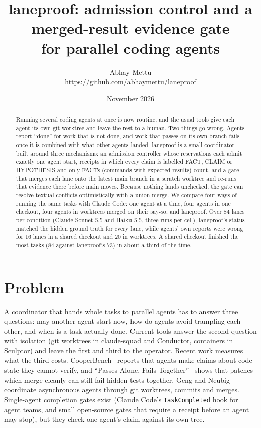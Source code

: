 \documentclass[11pt]{article}
\title{laneproof: admission control and a merged-result evidence gate\\for parallel coding agents}
\author{Abhay Mettu\\\small\url{https://github.com/abhaymettu/laneproof}}
\date{November 2026}
\begin{document}
\maketitle

\begin{abstract}
Running several coding agents at once is now routine, and the usual tools give each agent its own git worktree and
leave the rest to a human. Two things go wrong. Agents report ``done'' for work that is not done, and work that
passes on its own branch fails once it is combined with what other agents landed. laneproof is a small coordinator
built around three mechanisms: an admission controller whose reservations each admit exactly one agent start, receipts
in which every claim is labelled FACT, CLAIM or HYPOTHESIS and only FACTs (commands with expected results) count, and
a gate that merges each lane onto the latest main branch in a scratch worktree and re-runs that evidence there before
main moves. Because nothing lands unchecked, the gate can resolve textual conflicts optimistically with a union merge.
We compare four ways of running the same tasks with Claude Code: one agent at a time, four agents in one checkout,
four agents in worktrees merged on their say-so, and laneproof. Over 84 lanes per condition (Claude Sonnet 5.5 and Haiku 5.5, three runs per cell), laneproof's status matched the hidden
ground truth for every lane, while agents' own reports were wrong for 16 lanes in a shared checkout and 20 in
worktrees. A shared checkout finished the most tasks (84 against laneproof's 73) in about a third of the time.
\end{abstract}

\section{Problem}
A coordinator that hands whole tasks to parallel agents has to answer three questions: may another agent start now,
how do agents avoid trampling each other, and when is a task actually done. Current tools answer the second question
with isolation (git worktrees in claude-squad and Conductor, containers in Sculptor) and leave the first and third to
the operator. Recent work measures what the third costs. CooperBench~\cite{cooperbench} reports that agents make claims
about code state they cannot verify, and ``Passes Alone, Fails Together''~\cite{passesalone} shows that patches which
merge cleanly can still fail hidden tests together. Geng and Neubig~\cite{caid} coordinate asynchronous agents through git worktrees, commits and merges.
Single-agent completion gates exist (Claude Code's \texttt{TaskCompleted} hook for agent teams, and small open-source
gates that require a receipt before an agent may stop), but they check one agent's claim against its own tree.
\end{document}
